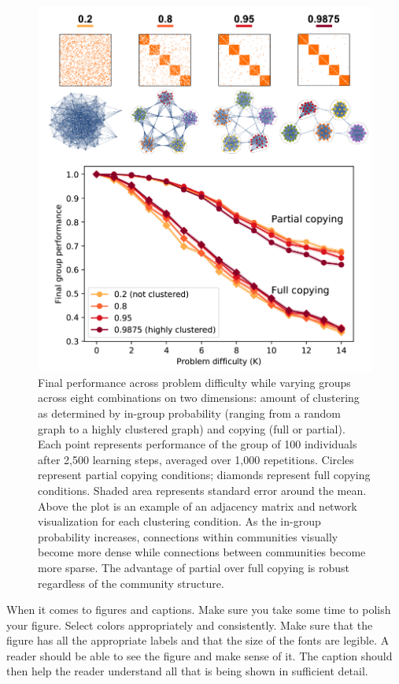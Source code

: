 \documentclass[letterpaper]{article}
\begin{document}
\begin{figure}[!htb]
\begin{center}
\includegraphics[width=\linewidth]{fig2.pdf}
\caption{Final performance across problem difficulty while varying groups across eight combinations on two dimensions: amount of clustering as determined by in-group probability (ranging from a random graph to a highly clustered graph) and copying (full or partial). Each point represents performance of the group of 100 individuals after 2,500 learning steps, averaged over 1,000 repetitions. Circles represent partial copying conditions; diamonds represent full copying conditions. Shaded area represents standard error around the mean. Above the plot is an example of an adjacency matrix and network visualization for each clustering condition. As the in-group probability increases, connections within communities visually become more dense while connections between communities become more sparse. The advantage of partial over full copying is robust regardless of the community structure.}
\label{fig2}
\end{center}
\end{figure}

When it comes to figures and captions. Make sure you take some time to polish your figure. Select colors appropriately and consistently. Make sure that the figure has all the appropriate labels and that the size of the fonts are legible. A reader should be able to see the figure and make sense of it. The caption should then help the reader understand all that is being shown in sufficient detail.
\end{document}
